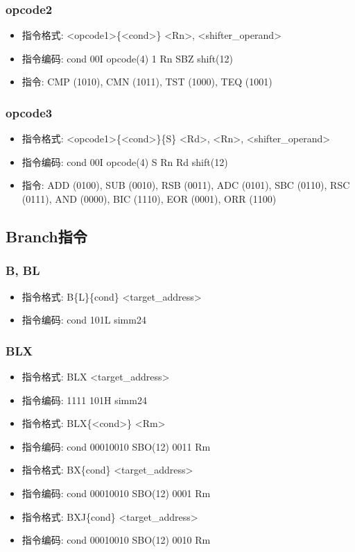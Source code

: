 \documentclass[10pt]{book}
\begin{document}
\subsubsection{opcode2}
\begin{itemize}
  \item 指令格式: <opcode1>\{<cond>\} <Rn>, <shifter\_operand>
  \item 指令编码: cond 00I opcode(4) 1 Rn SBZ shift(12)
  \item 指令: CMP (1010), CMN (1011), TST (1000), TEQ (1001)
\end{itemize}

\subsubsection{opcode3}
\begin{itemize}
  \item 指令格式: <opcode1>\{<cond>\}\{S\} <Rd>, <Rn>, <shifter\_operand>
  \item 指令编码: cond 00I opcode(4) S Rn Rd shift(12)
  \item 指令: ADD (0100), SUB (0010), RSB (0011), ADC (0101), SBC (0110), RSC (0111), AND (0000), BIC (1110), EOR (0001), ORR (1100)
\end{itemize}

\subsection{Branch指令}
\subsubsection{B, BL}
\begin{itemize}
  \item 指令格式: B\{L\}\{cond\} <target\_address>
  \item 指令编码: cond 101L simm24
\end{itemize}

\subsubsection{BLX}
\begin{itemize}
  \item 指令格式: BLX <target\_address>
  \item 指令编码: 1111 101H simm24
  \item 指令格式: BLX\{<cond>\} <Rm>
  \item 指令编码: cond 00010010 SBO(12) 0011 Rm
  \item 指令格式: BX\{cond\} <target\_address>
  \item 指令编码: cond 00010010 SBO(12) 0001 Rm
  \item 指令格式: BXJ\{cond\} <target\_address>
  \item 指令编码: cond 00010010 SBO(12) 0010 Rm
\end{itemize}
\end{document}
